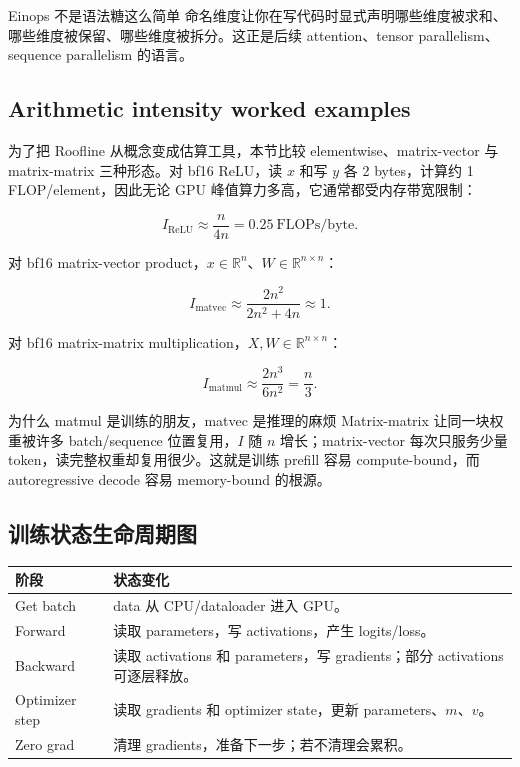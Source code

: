 \documentclass[a4paper]{article}
\begin{document}
\begin{warningbox}{Einops 不是语法糖这么简单}
命名维度让你在写代码时显式声明哪些维度被求和、哪些维度被保留、哪些维度被拆分。这正是后续 attention、tensor parallelism、sequence parallelism 的语言。
\end{warningbox}

\subsection{Arithmetic intensity worked examples}

为了把 Roofline 从概念变成估算工具，本节比较 elementwise、matrix-vector 与 matrix-matrix 三种形态。对 bf16 ReLU，读 \(x\) 和写 \(y\) 各 2 bytes，计算约 1 FLOP/element，因此无论 GPU 峰值算力多高，它通常都受内存带宽限制：

\[
I_{\mathrm{ReLU}}\approx \frac{n}{4n}=0.25\ \text{FLOPs/byte}.
\]

对 bf16 matrix-vector product，\(x\in\mathbb{R}^n\)、\(W\in\mathbb{R}^{n\times n}\)：

\[
I_{\mathrm{matvec}}
\approx
\frac{2n^2}{2n^2+4n}
\approx 1.
\]

对 bf16 matrix-matrix multiplication，\(X,W\in\mathbb{R}^{n\times n}\)：

\[
I_{\mathrm{matmul}}
\approx
\frac{2n^3}{6n^2}
=\frac{n}{3}.
\]

\begin{importantbox}{为什么 matmul 是训练的朋友，matvec 是推理的麻烦}
Matrix-matrix 让同一块权重被许多 batch/sequence 位置复用，\(I\) 随 \(n\) 增长；matrix-vector 每次只服务少量 token，读完整权重却复用很少。这就是训练 prefill 容易 compute-bound，而 autoregressive decode 容易 memory-bound 的根源。
\end{importantbox}

\subsection{训练状态生命周期图}

\begin{center}
\begin{tabular}{p{}p{}}
\toprule
\textbf{阶段} & \textbf{状态变化} \\
\midrule
Get batch & data 从 CPU/dataloader 进入 GPU。 \\
Forward & 读取 parameters，写 activations，产生 logits/loss。 \\
Backward & 读取 activations 和 parameters，写 gradients；部分 activations 可逐层释放。 \\
Optimizer step & 读取 gradients 和 optimizer state，更新 parameters、\(m\)、\(v\)。 \\
Zero grad & 清理 gradients，准备下一步；若不清理会累积。 \\
\bottomrule
\end{tabular}
\end{center}
\end{document}
